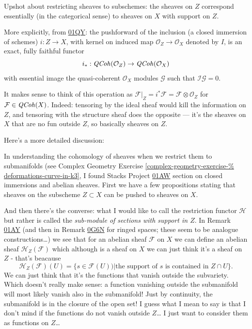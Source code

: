 \noindent
Upshot about restricting sheaves to
subschemes:
the sheaves on $Z$ correspond essentially
(in the categorical sense)
to sheaves on $X$ with support on $Z$.

More explicitly, from
\href{https://stacks.math.columbia.edu/tag/%
01QY}{01QY}:
the pushforward of the inclusion (a closed
immersion of schemes)
$i:Z \to X$, with kernel on induced map
$\mathcal{O}_Z \to \mathcal{O}_X$
denoted by $I$, is an exact, fully faithful
functor
$$
i_*:\mathit{QCoh}(\mathcal{O}_Z) \to
\mathit{QCoh}(\mathcal{O}_X)
$$
with essential image the quasi-coherent
$\mathcal{O}_X$ modules
$\mathcal{G}$ such that
$\mathcal{I}\mathcal{G}=0$.

It makes sense to think of this operation as
$\mathcal{F}|_Z=i^*\mathcal{F}=\mathcal{F}
\otimes\mathcal{O}_Z$
for $\mathcal{F}\in\mathit{QCoh}(X)$.
Indeed: tensoring by the ideal sheaf would
kill the information on $Z$,
and tensoring with the structure sheaf does
the opposite
--- it's the sheaves on $X$ that are no fun
outside $Z$,
so basically sheaves on $Z$.

\medskip\noindent
Here's a more detailed discussion:

In understanding the cohomology of sheaves
when
we restrict them to submanifolds (see Complex
Geometry
Exercise
\ref{complex-geometry-exercise-%
deformations-curve-in-k3},
I found Stacks Project
\href{https://stacks.math.columbia.edu/tag/%
01AW}{01AW}
section on closed immersions and abelian
sheaves.
First we have a few propositions stating that
sheaves on the subscheme $Z \subset X$ can be
pushed
to sheaves on $X$.

And then there's the converse:
what I would like to call the restriction
functor $\mathcal{H}$
but rather is called the {\it sub-module of
sections with support in $Z$}.
In Remark
\href{https://stacks.math.columbia.edu/tag/%
01AY}{01AY}
(and then in Remark
\href{https://stacks.math.columbia.edu/tag/%
0G6N}{0G6N}
for ringed spaces; these seem to be analogue
constructions…)
we see that for an abelian sheaf
$\mathcal{F}$ on $X$
we can define an abelian sheaf
$\mathcal{H}_Z(\mathcal{F})$
which although is a sheaf on $X$
we can just think it's a sheaf on $Z$ -
that's beacause
$$
\mathcal{H}_Z(\mathcal{F})(U)
=\{s \in \mathcal{F}(U))| \text{the support
of $s$ is contained in }Z\cap U\}.
$$
We can just think that it's the functions
that vanish outside the subvariety.
Which doesn't really make sense:
a function vanishing outside the submanifold
will most likely
vanish also in the submanifold! Just by
continuity,
the submanifold is in the closure of the open
set!
I guess what I mean to say is that I don't
mind if
the functions do not vanish outside $Z$…
I just want to consider them as functions on
$Z$…

